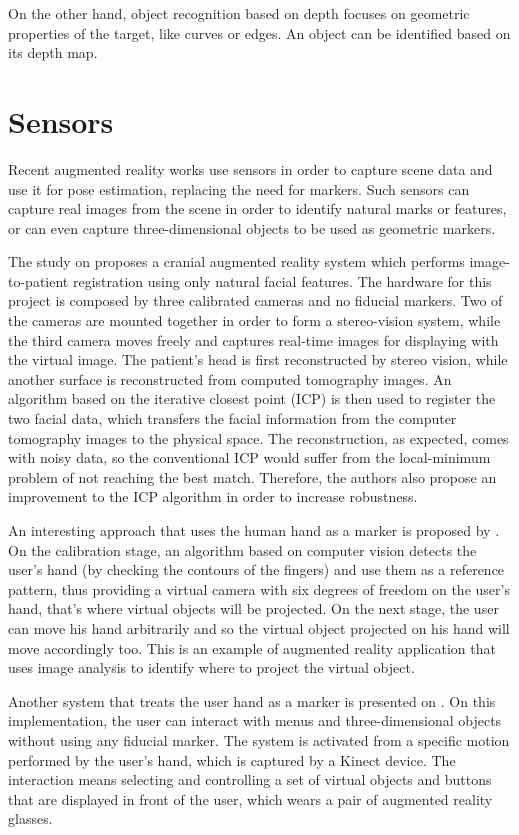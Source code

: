 \documentclass[msc, a4paper, classic, en]{ufbathesis}
\begin{document}
On the other hand, object recognition based on depth focuses on geometric properties of the target, like curves or edges. An object can be identified based on its depth map.

\section{Sensors}

Recent augmented reality works use sensors in order to capture scene data and use it for pose estimation, replacing the need for markers. Such sensors can capture real images from the scene in order to identify natural marks or features, or can even capture three-dimensional objects to be used as geometric markers.

The study on \cite{Lee20125286} proposes a cranial augmented reality system which performs image-to-patient registration using only natural facial features. The hardware for this project is composed by three calibrated cameras and no fiducial markers. Two of the cameras are mounted together in order to form a stereo-vision system, while the third camera moves freely and captures real-time images for displaying with the virtual image. The patient's head is first reconstructed by stereo vision, while another surface is reconstructed from computed tomography images. An algorithm based on the iterative closest point (ICP) is then used to register the two facial data, which transfers the facial information from the computer tomography images to the physical space. The reconstruction, as expected, comes with noisy data, so the conventional ICP would suffer from the local-minimum problem of not reaching the best match. Therefore, the authors also propose an improvement to the ICP algorithm in order to increase robustness.

An interesting approach that uses the human hand as a marker is proposed by \cite{4373785}. On the calibration stage, an algorithm based on computer vision detects the user's hand (by checking the contours of the fingers) and use them as a reference pattern, thus providing a virtual camera with six degrees of freedom on the user's hand, that's where virtual objects will be projected. On the next stage, the user can move his hand arbitrarily and so the virtual object projected on his hand will move accordingly too. This is an example of augmented reality application that uses image analysis to identify where to project the virtual object.

Another system that treats the user hand as a marker is presented on \cite{51078809}. On this implementation, the user can interact with menus and three-dimensional objects without using any fiducial marker. The system is activated from a specific motion performed by the user's hand, which is captured by a Kinect device. The interaction means selecting and controlling a set of virtual objects and buttons that are displayed in front of the user, which wears a pair of augmented reality glasses. 
\end{document}
